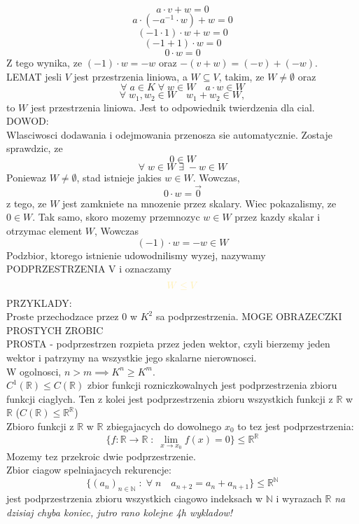\documentclass{article}
\newcommand{\R}{\mathbb{R}}
\newcommand{\N}{\mathbb{N}}
\begin{document}
  $$a\cdot v+w=0$$
  $$a\cdot (-a^{-1}\cdot w)+w=0$$
  $$(-1\cdot 1)\cdot w+w=0$$
  $$(-1+1)\cdot w=0$$
  $$0\cdot w=0$$
  Z tego wynika, ze $(-1)\cdot w=-w$ oraz $-(v+w)=(-v)+(-w)$.\bigskip\\
  \color{def}LEMAT \color{txt}jesli $V$ jest przestrzenia liniowa, a $W\subseteq V$, takim, ze $W\neq\emptyset$ oraz
  $$\forall\;a\in K\;\forall\;w\in W\quad a\cdot w\in W$$
  $$\forall\;w_1,w_2\in W\quad w_1+w_2\in W,$$
  to \color{acc}$W$ jest przestrzenia liniowa\color{txt}. Jest to odpowiednik twierdzenia dla cial.\medskip\\
  \color{emp}DOWOD:\color{txt}\smallskip\\
  Wlasciwosci dodawania i odejmowania przenosza sie automatycznie. Zostaje sprawdzic, ze
  $$0\in W$$
  $$\forall\;w\in W\;\exists\;-w\in W$$
  Poniewaz $W\neq\emptyset$, stad istnieje jakies $w\in W$. Wowczas, 
  $$0\cdot w=\overset{\to}{0}$$
  z tego, ze $W$ jest zamkniete na mnozenie przez skalary. Wiec pokazalismy, ze $0\in W$. Tak samo, skoro mozemy przemnozyc $w\in W$ przez kazdy skalar i otrzymac element $W$, Wowczas
  $$(-1)\cdot w =-w\in W$$
  Podzbior, ktorego istnienie udowodnilismy wyzej, nazywamy \color{def}PODPRZESTRZENIA V \color{txt} i oznaczamy
  $$\color{acc}W\leq V$$
  \color{emp}PRZYKLADY:\color{txt}\medskip\\
  Proste przechodzace przez 0 w $K^2$ sa podprzestrzenia. \color{tit}MOGE OBRAZECZKI PROSTYCH ZROBIC\color{txt}\smallskip\\
  \color{def}PROSTA \color{txt}- podprzestrzen rozpieta przez jeden wektor, czyli bierzemy jeden wektor i patrzymy na wszystkie jego skalarne nierownosci.\medskip\\
  W ogolnosci, $n>m\implies K^n\geq K^m$.\medskip\\
  $C^1(\R)\leq C(\R)$ zbior funkcji rozniczkowalnych jest podprzestrzenia zbioru funkcji ciaglych. Ten z kolei jest podprzestrzenia zbioru wszystkich funkcji z $\R$ w $\R$ ($C(\R)\leq\R^\R$)\medskip\\
  Zbioro funkcji z $\R$ w $\R$ zbiegajacych do dowolnego $x_0$ to tez jest podprzestrzenia:
  $$\{f:\R\to\R\;:\;\lim\limits_{x\to x_0}f(x)=0\}\leq \R^\R$$
  Mozemy tez przekroic dwie podprzestrzenie.\medskip\\
  Zbior ciagow spelniajacych rekurencje:
  $$\{(a_n)_{n\in\N}\;:\;\forall\;n\quad a_{n+2}=a_n+a_{n+1}\}\leq \R^\N$$
  jest podprzestrzenia zbioru wszystkich ciagowo indeksach w $\N$ i wyrazach $\R$
  \emph{na dzisiaj chyba koniec, jutro rano kolejne 4h wykladow!}
\end{document}
